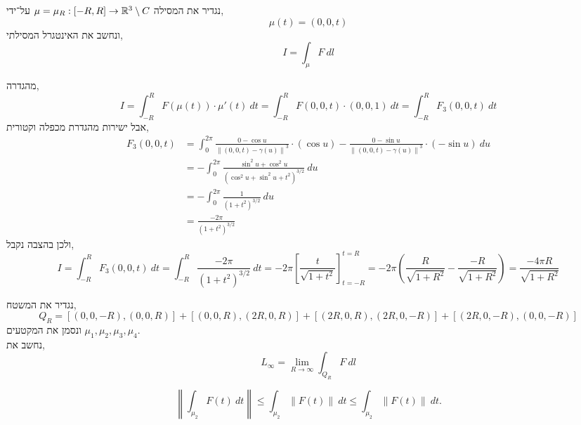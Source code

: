 \subquestion{}
נגדיר את המסילה $\mu = \mu_R : [-R, R] \to \mathbb{R}^3 \setminus C$ על־ידי,
\[
	\mu(t)
	= (0, 0, t)
\]
ונחשב את האינטגרל המסילתי,
\[
	I = \int_{\mu} F\ dl
\]
\begin{solution}
	מהגדרה,
	\[
		I
		= \int_{-R}^{R} F(\mu(t)) \cdot \mu'(t)\ dt
		= \int_{-R}^{R} F(0, 0, t) \cdot (0, 0, 1)\ dt
		= \int_{-R}^{R} F_3(0, 0, t)\ dt
	\]
	אבל ישירות מהגדרת מכפלה וקטורית,
	\begin{align*}
		F_3(0, 0, t)
		& = \int_{0}^{2 \pi} \frac{0 - \cos u}{{\lVert (0, 0, t) - \gamma(u) \rVert}^3} \cdot (\cos u) - \frac{0 - \sin u}{{\lVert (0, 0, t) - \gamma(u) \rVert}^3} \cdot (- \sin u)\ du \\
		& = - \int_{0}^{2 \pi} \frac{\sin^2 u + \cos^2 u}{{(\cos^2 u + \sin^2 u + t^2)}^{3 / 2}}\ du \\
		& = - \int_{0}^{2 \pi} \frac{1}{{(1 + t^2)}^{3 / 2}}\ du \\
		& = \frac{-2 \pi}{{(1 + t^2)}^{3 / 2}}
	\end{align*}
	ולכן בהצבה נקבל,
	\[
		I
		= \int_{-R}^{R} F_3(0, 0, t)\ dt
		= \int_{-R}^{R} \frac{-2 \pi}{{(1 + t^2)}^{3 / 2}}\ dt
		= - 2 \pi {\left[ \frac{t}{\sqrt{1 + t^2}}\right]}_{t = -R}^{t = R}
		= - 2 \pi \left(\frac{R}{\sqrt{1 + R^2}} - \frac{-R}{\sqrt{1 + R^2}}\right)
		= \frac{-4 \pi R}{\sqrt{1 + R^2}}
	\]
\end{solution}

\subquestion{}
נגדיר את המשטח,
\[
	Q_R
	= [(0, 0, -R), (0, 0, R)] + [(0, 0, R), (2R, 0, R)] + [(2R, 0, R), (2R, 0, -R)] + [(2R, 0, -R), (0, 0, -R)]
\]
ונסמן את המקטעים $\mu_1, \mu_2, \mu_3, \mu_4$. \\
נחשב את,
\[
	L_{\infty}
	= \lim_{R \to \infty} \int_{Q_R} F\ dl
\]
\begin{solution}
	\[
		\left\lVert \int_{\mu_2} F(t)\ dt \right\rVert
		\le \int_{\mu_2} \left\lVert F(t) \right\rVert\ dt
		\le \int_{\mu_2} \left\lVert F(t) \right\rVert\ dt
	.\]
\end{solution}


